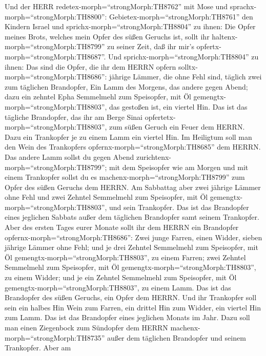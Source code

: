  Und der HERR redetex-morph=``strongMorph:TH8762'' mit Mose
und sprachx-morph=``strongMorph:TH8800'': 
Gebietex-morph=``strongMorph:TH8761'' den Kindern Israel und
sprichx-morph=``strongMorph:TH8804'' zu ihnen: Die Opfer meines Brots,
welches mein Opfer des süßen Geruchs ist, sollt ihr
haltenx-morph=``strongMorph:TH8799'' zu seiner Zeit, daß ihr mir's
opfertx-morph=``strongMorph:TH8687''.  Und
sprichx-morph=``strongMorph:TH8804'' zu ihnen: Das sind die Opfer, die
ihr dem HERRN opfern solltx-morph=``strongMorph:TH8686'': jährige
Lämmer, die ohne Fehl sind, täglich zwei zum täglichen Brandopfer,
 Ein Lamm des Morgens, das andere gegen Abend; 
dazu ein zehntel Epha Semmelmehl zum Speisopfer, mit Öl
gemengtx-morph=``strongMorph:TH8803'', das gestoßen ist, ein viertel
Hin.  Das ist das tägliche Brandopfer, das ihr am Berge
Sinai opfertetx-morph=``strongMorph:TH8803'', zum süßen Geruch ein Feuer
dem HERRN.  Dazu ein Trankopfer je zu einem Lamm ein viertel
Hin. Im Heiligtum soll man den Wein des Trankopfers
opfernx-morph=``strongMorph:TH8685'' dem HERRN.  Das andere
Lamm sollst du gegen Abend zurichtenx-morph=``strongMorph:TH8799''; mit
dem Speisopfer wie am Morgen und mit einem Trankopfer sollst du es
machenx-morph=``strongMorph:TH8799'' zum Opfer des süßen Geruchs dem
HERRN.  Am Sabbattag aber zwei jährige Lämmer ohne Fehl und
zwei Zehntel Semmelmehl zum Speisopfer, mit Öl
gemengtx-morph=``strongMorph:TH8803'', und sein Trankopfer.
 Das ist das Brandopfer eines jeglichen Sabbats außer dem
täglichen Brandopfer samt seinem Trankopfer.  Aber des
ersten Tages eurer Monate sollt ihr dem HERRN ein Brandopfer
opfernx-morph=``strongMorph:TH8686'': Zwei junge Farren, einen Widder,
sieben jährige Lämmer ohne Fehl;  und je drei Zehntel
Semmelmehl zum Speisopfer, mit Öl gemengtx-morph=``strongMorph:TH8803'',
zu einem Farren; zwei Zehntel Semmelmehl zum Speisopfer, mit Öl
gemengtx-morph=``strongMorph:TH8803'', zu einem Widder; 
und je ein Zehntel Semmelmehl zum Speisopfer, mit Öl
gemengtx-morph=``strongMorph:TH8803'', zu einem Lamm. Das ist das
Brandopfer des süßen Geruchs, ein Opfer dem HERRN.  Und ihr
Trankopfer soll sein ein halbes Hin Wein zum Farren, ein drittel Hin zum
Widder, ein viertel Hin zum Lamm. Das ist das Brandopfer eines jeglichen
Monats im Jahr.  Dazu soll man einen Ziegenbock zum
Sündopfer dem HERRN machenx-morph=``strongMorph:TH8735'' außer dem
täglichen Brandopfer und seinem Trankopfer.  Aber am
